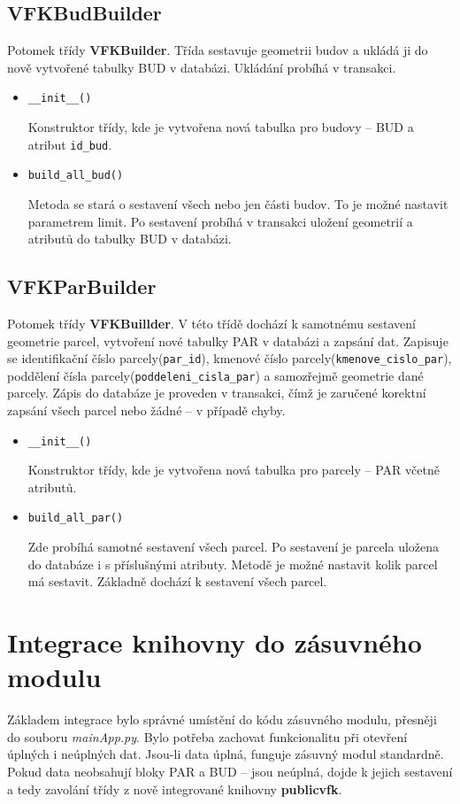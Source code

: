 \subsection{VFKBudBuilder}
Potomek třídy \textbf{VFKBuilder}. Třída sestavuje geometrii budov a ukládá ji do nově vytvořené tabulky BUD v databázi. Ukládání probíhá v transakci.
\begin{itemize}[leftmargin=50pt]
\item \verb|__init__()|

Konstruktor třídy, kde je vytvořena nová tabulka pro budovy -- BUD a atribut \verb|id_bud|.
\item \verb|build_all_bud()|

Metoda se stará o sestavení všech nebo jen části budov. To je možné nastavit parametrem limit. Po sestavení probíhá v transakci uložení geometrií a atributů do tabulky BUD v databázi.
\end{itemize}
\subsection{VFKParBuilder}
Potomek třídy \textbf{VFKBuillder}. V této třídě dochází k samotnému sestavení geometrie parcel, vytvoření nové tabulky PAR v databázi a zapsání dat. Zapisuje se identifikační číslo parcely(\verb|par_id|), kmenové číslo parcely(\verb|kmenove_cislo_par|), poddělení čísla parcely(\verb|poddeleni_cisla_par|) a samozřejmě geometrie dané parcely. Zápis do databáze je proveden v transakci, čímž je zaručené korektní zapsání všech parcel nebo žádné -- v případě chyby.

\begin{itemize}[leftmargin=50pt]
\item \verb|__init__()|

Konstruktor třídy, kde je vytvořena nová tabulka pro parcely -- PAR včetně atributů.
\item \verb|build_all_par()|

Zde probíhá samotné sestavení všech parcel. Po sestavení je parcela uložena do databáze i s příslušnými atributy. Metodě je možné nastavit kolik parcel má sestavit. Základně dochází k sestavení všech parcel.

\end{itemize}
\section{Integrace knihovny do zásuvného modulu}
Základem integrace bylo správné umístění do kódu zásuvného modulu, přesněji do souboru \textit{mainApp.py}. Bylo potřeba zachovat funkcionalitu při otevření úplných i neúplných dat. Jsou-li data úplná, funguje zásuvný modul standardně. Pokud data neobsahují bloky PAR a BUD -- jsou neúplná, dojde k jejich sestavení a tedy zavolání třídy z nově integrované knihovny \textbf{publicvfk}.

